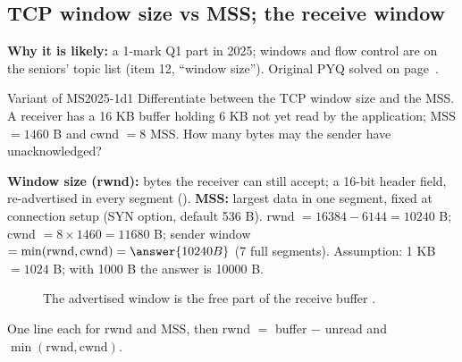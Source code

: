 \subsection{TCP window size vs MSS; the receive window}\label{iq:C35}
    

\textbf{Why it is likely:} a 1-mark Q1 part in 2025; windows and flow control are on the seniors' topic list (item 12, ``window size''). Original PYQ solved on page~\pageref{q:MS2025-1d}.

\begin{question}{Variant of MS2025-1d}{1}
Differentiate between the TCP window size and the MSS. A receiver has a 16 KB buffer holding 6 KB not yet read by the application; MSS $=1460$ B and cwnd $=8$ MSS. How many bytes may the sender have unacknowledged?
\end{question}
\begin{solution}
\textbf{Window size (rwnd):} bytes the receiver can still accept; a 16-bit header field, re-advertised in every segment (). \textbf{MSS:} largest data in one segment, fixed at connection setup (SYN option, default 536 B).
rwnd $=16384-6144=10240$ B; cwnd $=8\times1460=11680$ B; sender window $=\min(\text{rwnd},\text{cwnd})=\answer{10240 B}$ (7 full segments). Assumption: 1 KB $=1024$ B; with 1000 B the answer is 10000 B.
\end{solution}
\begin{figure}[H]\centering
{}
\caption{The advertised window is the free part of the receive buffer .}\end{figure}
\begin{answerplan}[1 mark]
One line each for rwnd and MSS, then rwnd $=$ buffer $-$ unread and $\min(\text{rwnd},\text{cwnd})$.
\end{answerplan}


